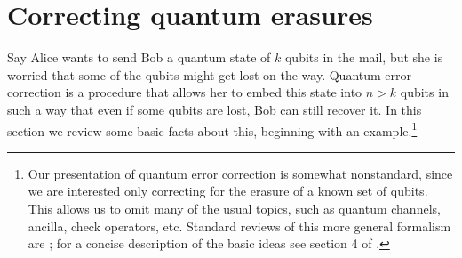 \documentclass[12pt]{article}
\begin{document}
\section{Correcting quantum erasures}\label{qcorrsec}
Say Alice wants to send Bob a quantum state of $k$ qubits in the mail, but she is worried that some of the qubits might get lost on the way.  Quantum error correction is a procedure that allows her to embed this state into $n>k$ qubits in such a way that even if some qubits are lost, Bob can still recover it.  In this section we review some basic facts about this, beginning with an example.\footnote{Our presentation of quantum error correction is somewhat nonstandard, since we are interested only correcting for the erasure of a known set of qubits. This allows us to omit many of the usual topics, such as quantum channels, ancilla, check operators, etc.  Standard reviews of this more general formalism are \cite{preskillnotes,nielsen2010quantum}; for a concise description of the basic ideas see section 4 of \cite{Harlow:2013tf}.}
\end{document}
